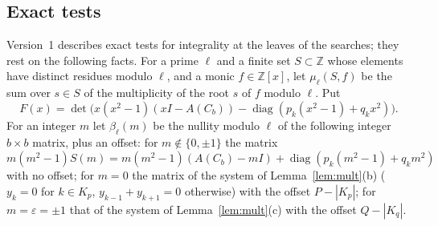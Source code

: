 \documentclass[11pt]{article}
\theoremstyle{definition}
\theoremstyle{remark}
\DeclareMathOperator{\diag}{diag}
\newcommand{\Z}{\mathbb Z}
\begin{document}
\subsection{Exact tests}\label{sec:tests}
Version~1 describes exact tests for integrality at the leaves of the searches;
they rest on the following facts. For a prime $\ell$ and a
finite set $S\subset\Z$ whose elements have distinct residues modulo $\ell$, and
a monic $f\in\Z[x]$, let $\mu_\ell(S,f)$ be the sum over $s\in S$ of the
multiplicity of the root $s$ of $f$ modulo $\ell$. Put
\[
 F(x)=\det\bigl(x(x^2-1)(xI-A(C_b))-\diag(p_k(x^2-1)+q_kx^2)\bigr).
\]
For an integer $m$ let $\beta_\ell(m)$ be the nullity modulo $\ell$ of the
following integer $b\times b$ matrix, plus an offset: for $m\notin\{0,\pm1\}$
the matrix $m(m^2-1)S(m)=m(m^2-1)(A(C_b)-mI)+\diag(p_k(m^2-1)+q_km^2)$ with no
offset; for $m=0$ the matrix of the system of Lemma~\ref{lem:mult}(b) ($y_k=0$
for $k\in K_p$, $y_{k-1}+y_{k+1}=0$ otherwise) with the offset $P-|K_p|$; for
$m=\varepsilon=\pm1$ that of the system of Lemma~\ref{lem:mult}(c) with the
offset $Q-|K_q|$.
\end{document}
